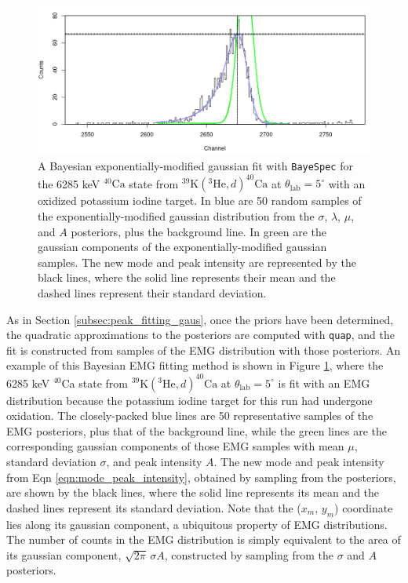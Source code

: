 \begin{figure}[t]
\centering
\includegraphics[width=6.5in]{Chapter-6/figs/ExpModGauss_Mode_and_Intensity.png}
\caption{\label{fig:EMG_Mode}A Bayesian exponentially-modified gaussian fit with \texttt{BayeSpec} for the 6285 keV $^{40}\mathrm{Ca}$ state from $^{39}\mathrm{K}(^{3}\mathrm{He},d)^{40}\mathrm{Ca}$ at $\theta_{\mathrm{lab}} = 5^{\circ}$ with an oxidized potassium iodine target. In blue are 50 random samples of the exponentially-modified gaussian distribution from the $\sigma$, $\lambda$, $\mu$, and $A$ posteriors, plus the background line. In green are the gaussian components of the exponentially-modified gaussian samples. The new mode and peak intensity are represented by the black lines, where the solid line represents their mean and the dashed lines represent their standard deviation.}
\end{figure}

As in Section \ref{subsec:peak_fitting_gaus}, once the priors have been determined, the quadratic approximations to the posteriors are computed with \texttt{quap}, and the fit is constructed from samples of the EMG distribution with those posteriors. An example of this Bayesian EMG fitting method is shown in Figure \ref{fig:EMG_Mode}, where the 6285 keV $^{40}$Ca state from $^{39}\mathrm{K}(^{3}\mathrm{He},d)^{40}\mathrm{Ca}$ at $\theta_{\mathrm{lab}} = 5^{\circ}$ is fit with an EMG distribution because the potassium iodine target for this run had undergone oxidation. %
The closely-packed blue lines are 50 representative samples of the EMG posteriors, plus that of the background line, while the green lines are the corresponding gaussian components of those EMG samples with mean $\mu$, standard deviation $\sigma$, and peak intensity $A$. The new mode and peak intensity from Eqn \ref{eqn:mode_peak_intensity}, obtained by sampling from the posteriors, are shown by the black lines, where the solid line represents its mean and the dashed lines represent its standard deviation. Note that the ($x_{m}$, $y_{m}$) coordinate lies along its gaussian component, a ubiquitous property of EMG distributions. The number of counts in the EMG distribution is simply equivalent to the area of its gaussian component, $\sqrt{2\pi} \, \sigma A$, constructed by sampling from the $\sigma$ and $A$ posteriors.

